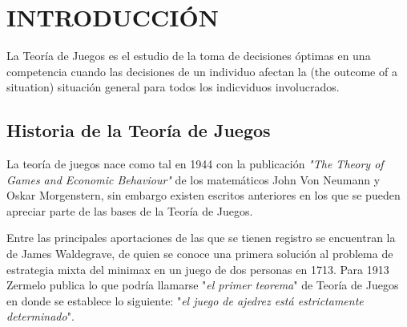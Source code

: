 \chapter{INTRODUCCIÓN}

La Teoría de Juegos es el estudio de la toma de decisiones óptimas en una competencia cuando  las decisiones de un individuo afectan la (the outcome of a situation) situación general para todos los indicviduos involucrados.

\section{Historia de la Teoría de Juegos}

La teoría de juegos nace como tal en 1944 con la publicación \textit{"The Theory of Games and Economic Behaviour"} de los matemáticos John Von Neumann y Oskar Morgenstern, sin embargo existen escritos anteriores en los que se pueden apreciar parte de las bases de la Teoría de Juegos.

Entre las principales aportaciones de las que se tienen registro se encuentran la de James Waldegrave, de quien se conoce una primera solución al problema de estrategia mixta del minimax en un juego de dos personas en 1713. Para 1913 Zermelo publica lo que podría llamarse "\textit{el primer teorema}" de Teoría de Juegos en donde se establece lo siguiente: "\textit{el juego de ajedrez está estrictamente determinado}". 

